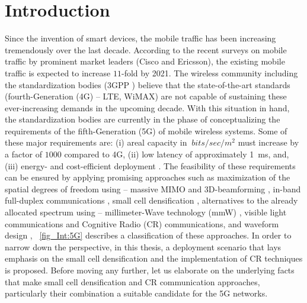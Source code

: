 \chapter{Introduction}
\label{chap:Int}

Since the invention of smart devices, the mobile traffic has been increasing tremendously over the last decade. According to the recent surveys on mobile traffic by prominent market leaders (Cisco \cite{CISCO14} and Ericsson\cite{Eric15}), the existing mobile traffic is expected to increase $11$-fold  by 2021. The wireless community including the standardization bodies (3GPP \cite{3GPP}) believe that the state-of-the-art standards (fourth-Generation (4G) -- LTE, WiMAX) are not capable of sustaining these ever-increasing demands in the upcoming decade. With this situation in hand, the standardization bodies are currently in the phase of conceptualizing the requirements of the fifth-Generation (5G) of mobile wireless systems.
Some of these major requirements are: (i) areal capacity in $\SI{}{bits/sec/m^2}$ must increase by a factor of $1000$ compared to 4G, (ii) low latency of approximately \SI{1}{ms}, and, (iii) energy- and cost-efficient deployment \cite{Qual13, Andrews14}.
The feasibility of these requirements can be ensured by applying promising approaches such as maximization of the spatial degrees of freedom using -- massive MIMO \cite{Lar14} and 3D-beamforming \cite{Hal13}, in-band full-duplex communications \cite{Sab14}, small cell densification \cite{Andrews12, Gel13}, alternatives to the already allocated spectrum using -- millimeter-Wave technology (mmW) \cite{Rapp13}, visible light communications \cite{Wu14} and Cognitive Radio (CR) communications, and waveform design \cite{Scha14, Baz15}, \figurename~\ref{fig_Int:5G} describes a classification of these approaches. In order to narrow down the perspective, in this thesis, a deployment scenario that lays emphasis on the small cell densification and the implementation of CR techniques is proposed. Before moving any further, let us elaborate on the underlying facts that make small cell densification and CR communication approaches, particularly their combination a suitable candidate for the 5G networks. 

